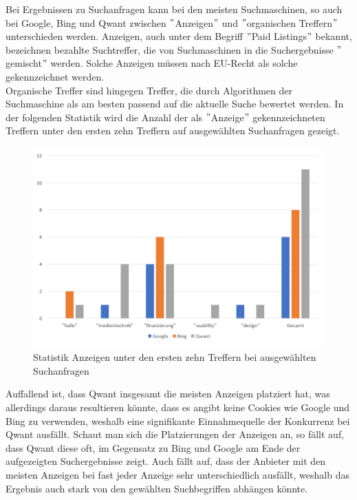 Bei Ergebnissen zu Suchanfragen kann bei den meisten Suchmaschinen, so auch bei Google,
Bing und Qwant zwischen \("\)Anzeigen\("\) und \("\)organischen Treffern\("\) unterschieden werden.
Anzeigen, auch unter dem Begriff \("\)Paid Listings\("\) bekannt, bezeichnen bezahlte Suchtreffer,
die von Suchmaschinen in die Suchergebnisse \("\)gemischt\("\) werden.
Solche Anzeigen müssen nach EU-Recht als solche gekennzeichnet werden.\\
Organische Treffer sind hingegen Treffer, die durch Algorithmen der Suchmaschine als am besten passend auf die aktuelle Suche bewertet werden.
In der folgenden Statistik wird die Anzahl der als \("\)Anzeige\("\) gekennzeichneten Treffern unter den ersten zehn Treffern auf ausgewählten Suchanfragen gezeigt.\cite{LEW18}\\
\begin{figure}[h]
    \centering
    \includegraphics[width=120mm]{images/statistic_adverts}
    \caption{Statistik Anzeigen unter den ersten zehn Treffern bei ausgewählten Suchanfragen}
    \label{fig:statisticAdverts}
\end{figure}
Auffallend ist, dass Qwant insgesamt die meisten Anzeigen platziert hat, was allerdings daraus resultieren könnte,
dass es angibt keine Cookies wie Google und Bing zu verwenden, weshalb eine signifikante Einnahmequelle der Konkurrenz bei Qwant ausfällt.
Schaut man sich die Platzierungen der Anzeigen an, so fällt auf, dass Qwant diese oft,
im Gegensatz zu Bing und Google am Ende der aufgezeigten Suchergebnisse zeigt.
Auch fällt auf, dass der Anbieter mit den meisten Anzeigen bei fast jeder Anzeige sehr unterschiedlich ausfällt,
weshalb das Ergebnis auch stark von den gewählten Suchbegriffen abhängen könnte.\\